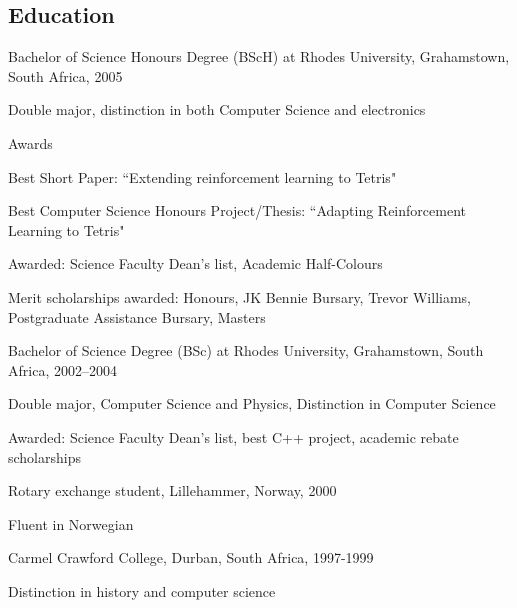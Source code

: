 \documentclass{article}
\begin{document}
\subsection*{Education}
\begin{itemize}
\item{Bachelor of Science Honours Degree (BScH) at Rhodes University, Grahamstown, South Africa, 2005}
	\end{itemize*}
\item{Bachelor of Science Degree (BSc) at Rhodes University, Grahamstown, South Africa, 2002--2004}
	\begin{itemize*}
	\item{Double major, Computer Science and Physics, Distinction in Computer Science}
        \item{Awarded: Science Faculty Dean's list, best C++ project, academic rebate scholarships}
	\end{itemize*}
\item{Rotary exchange student, Lillehammer, Norway, 2000}
        \begin{itemize*}
        \item{	Fluent in Norwegian}
        \end{itemize*}
\item{Carmel Crawford College, Durban, South Africa, 1997-1999}
	\begin{itemize*}
	\item{	Distinction in history and computer science}
	\end{itemize*}
\end{itemize}
\end{document}
